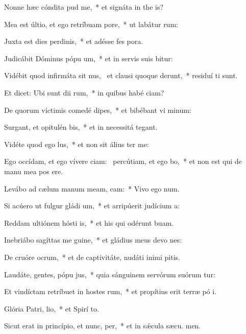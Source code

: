 \item Nonne hæc cóndita  pud me,~* et signáta in the is?
\item Mea est últio, et ego retríbuam  pore,~* ut labátur  rum:
\item Juxta est dies perdinis,~* et adésse fes pora.
\item Judicábit Dóminus pópu um,~* et in servis suis bitur:
\item Vidébit quod infirmáta sit nus,~\pscross{} et clausi quoque derunt,~* residuí ti sunt.
\item Et dicet: Ubi sunt dii rum,~* in quibus habé ciam?
\item De quorum víctimis comedé dipes,~* et bibébant vi minum:
\item Surgant, et opitulén bis,~* et in necessitá  tegant.
\item Vidéte quod ego  lus,~* et non sit álius  ter me:
\item Ego occídam, et ego vívere ciam:~\pscross{} percútiam, et ego bo,~* et non est qui de manu mea pos ere.
\item Levábo ad cælum manum meam,  cam:~* Vivo ego  num.
\item Si acúero ut fulgur gládi um,~* et arripúerit judícium  a:
\item Reddam ultiónem hósti is,~* et his qui odérunt  buam.
\item Inebriábo sagíttas me guine,~* et gládius meus devo nes:
\item De cruóre ocrum,~* et de captivitáte, nudáti inimi pitis.
\item Laudáte, gentes, pópu jus,~* quia sánguinem servórum suórum tur:
\item Et vindíctam retríbuet in hostes rum,~* et propítius erit terræ pó i.
\item \singlecolsep
\item Glória Patri,  lio,~* et Spirí to.
\item Sicut erat in princípio, et nunc,  per,~* et in sǽcula sæcu. men.

